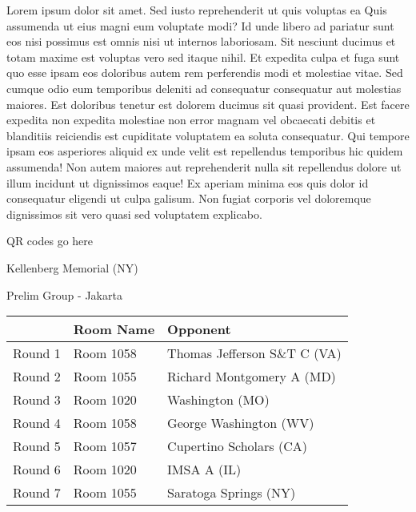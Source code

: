 \documentclass{article}%
\begin{document}
\vspace*{8pt}%
\linebreak%
\newline%
\newline%
Lorem ipsum dolor sit amet. Sed iusto reprehenderit ut quis voluptas ea Quis assumenda ut eius magni eum voluptate modi? Id unde libero ad pariatur sunt eos nisi possimus est omnis nisi ut internos laboriosam. Sit nesciunt ducimus et totam maxime est voluptas vero sed itaque nihil. Et expedita culpa et fuga sunt quo esse ipsam eos doloribus autem rem perferendis modi et molestiae vitae.\newline%
\newline%
Sed cumque odio eum temporibus deleniti ad consequatur consequatur aut molestias maiores. Est doloribus tenetur est dolorem ducimus sit quasi provident. Est facere expedita non expedita molestiae non error magnam vel obcaecati debitis et blanditiis reiciendis est cupiditate voluptatem ea soluta consequatur. Qui tempore ipsam eos asperiores aliquid ex unde velit est repellendus temporibus hic quidem assumenda!\newline%
\newline%
Non autem maiores aut reprehenderit nulla sit repellendus dolore ut illum incidunt ut dignissimos eaque! Ex aperiam minima eos quis dolor id consequatur eligendi ut culpa galisum. Non fugiat corporis vel doloremque dignissimos sit vero quasi sed voluptatem explicabo.\newline%
\newline%
%
\vspace*{30pt}%
\begin{center}%
\begin{Huge}%
QR codes go here%
\end{Huge}%
\end{center}%
\newpage%
%
\begin{center}%
\begin{Huge}%
Kellenberg Memorial (NY)%
\end{Huge}%
\vspace*{8pt}%
\linebreak%
\begin{Large}%
Prelim Group {-} Jakarta%
\end{Large}%
\end{center}%
\begin{tabularx}{\textwidth}{|c|Y|Y|}%
\hline%
&Room Name&Opponent\\%
\hline%
Round 1&Room 1058&Thomas Jefferson S\&T C (VA)\\%
Round 2&Room 1055&Richard Montgomery A (MD)\\%
Round 3&Room 1020&Washington (MO)\\%
Round 4&Room 1058&George Washington (WV)\\%
Round 5&Room 1057&Cupertino Scholars (CA)\\%
Round 6&Room 1020&IMSA A (IL)\\%
Round 7&Room 1055&Saratoga Springs (NY)\\%
\hline%
\end{tabularx}%
\end{document}
